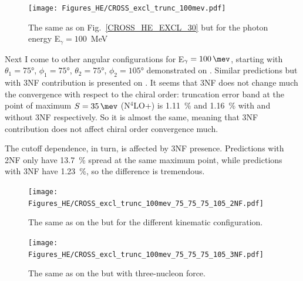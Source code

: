         \begin{figure}[h]
            \begin{center}
            \texttt{[image: Figures\_HE/CROSS\_excl\_trunc\_100mev.pdf]}
            \end{center}
            \caption{The same as on Fig.~\ref{CROSS_HE_EXCL_30} but 
            for the photon energy E$_\gamma=100$~MeV}
            \label{CROSS_HE_EXCL_100}
        \end{figure}

    Next I come to other angular configurations for E$_\gamma=\SI{100}{\mev}$, starting with 
    $\theta_1 = \ang{75}$, $\phi_1 = \ang{75}$,
    $\theta_2 = \ang{75}$, $\phi_2 = \ang{105}$
    demonstrated on .
    Similar predictions but with 3NF contribution is presented on .
    It seems that 3NF does not change much the convergence with respect to the chiral order:
    truncation error band at the point of maximum $S=\SI{35}{\mev}$ (N$^4$LO+)
    is \SI{1.11}{\percent} and \SI{1.16}{\percent} with and without 3NF respectively.
    So it is almost the same, meaning that 3NF contribution does not affect chiral order
    convergence much.

    The cutoff dependence, in turn, is affected by 3NF presence. Predictions with 2NF only have
    \SI{13.7}{\percent} spread at the same maximum point, while predictions with 3NF
    have  \SI{1.23}{\percent}, so the difference is tremendous.

        \begin{figure}[h]
            \begin{center}
                \texttt{[image: Figures\_HE/CROSS\_excl\_trunc\_100mev\_75\_75\_75\_105\_2NF.pdf]}
                \end{center}
                \caption{The same as on the  but for the different kinematic
                configuration.}
                \label{CROSS_HE_EXCL_75_75_75_105}
        \end{figure}

        \begin{figure}[h]
            \begin{center}
                \texttt{[image: Figures\_HE/CROSS\_excl\_trunc\_100mev\_75\_75\_75\_105\_3NF.pdf]}
                \end{center}
                \caption{The same as on the  but with three-nucleon force.}
                \label{CROSS_HE_EXCL_75_75_75_105_3NF}
        \end{figure}


